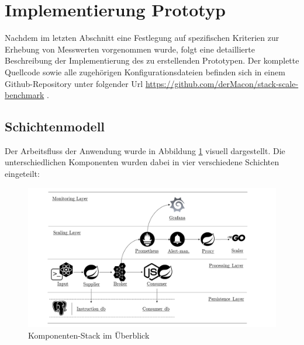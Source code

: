 \section{Implementierung Prototyp}
\label{sec:implementierung}

Nachdem im letzten Abschnitt eine Festlegung auf spezifischen Kriterien zur Erhebung von Messwerten vorgenommen wurde, folgt eine detaillierte Beschreibung der Implementierung des zu erstellenden Prototypen. Der komplette Quellcode sowie alle zugehörigen Konfigurationsdateien befinden sich in einem Github-Repository unter folgender Url \url{https://github.com/derMacon/stack-scale-benchmark} .

\subsection{Schichtenmodell \checkmark}
Der Arbeitsfluss der Anwendung wurde in Abbildung \ref{fig:stackOverview} visuell dargestellt. Die unterschiedlichen Komponenten wurden dabei in vier verschiedene Schichten eingeteilt: 

\begin{figure}[ht!]
	\centering
	\includegraphics[width=\linewidth]{kapitel/problemloesung/implementierung/_img/overview-bw}
	\caption[Komponenten-Stack im Überblick]{Komponenten-Stack im Überblick}
	\label{fig:stackOverview}
\end{figure}

